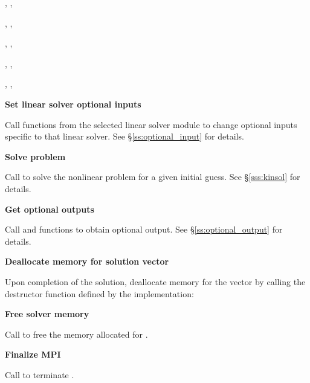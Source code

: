\begin{Steps}
  {\s, \omp, \pt} 

  {\s, \omp, \pt} 

  {\s, \omp, \pt} 

  {\s, \omp, \pt} 

  {\s, \omp, \pt} 

  
  
  
\item
  {\bf Set linear solver optional inputs}

  Call  functions from the selected linear solver module to
  change optional inputs specific to that linear solver.
  See \S\ref{ss:optional_input} for details.

\item
  {\bf Solve problem}

  Call  to solve the nonlinear problem for a given
  initial guess. See \S\ref{sss:kinsol} for details.

\item
  {\bf Get optional outputs}

  Call  and  functions to obtain optional output.
  See \S\ref{ss:optional_output} for details.

\item
  {\bf Deallocate memory for solution vector}

  Upon completion of the solution, deallocate memory for the vector 
  by calling the destructor function defined by the {\nvector} implementation:

  {\s} 

  {\omp} 

  {\pt} 

  {\p} 
  
\item
  {\bf Free solver memory}

  Call  to free the memory allocated for {\kinsol}.
  
\item 
  {\bf {\p} Finalize MPI}

  Call  to terminate {\mpi}.
  
\end{Steps}

